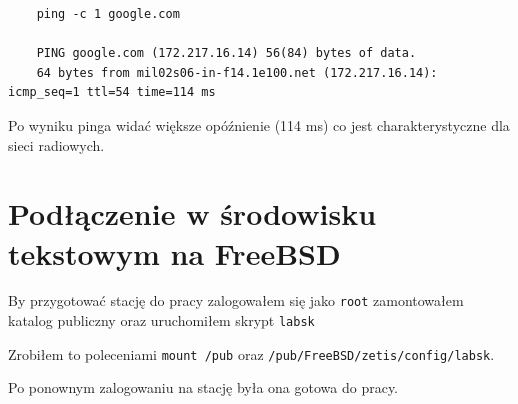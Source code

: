 \documentclass{mwart} %
\begin{document}
\begin{verbatim}
    ping -c 1 google.com

    PING google.com (172.217.16.14) 56(84) bytes of data. 
    64 bytes from mil02s06-in-f14.1e100.net (172.217.16.14): icmp_seq=1 ttl=54 time=114 ms 
\end{verbatim}
Po wyniku pinga widać większe opóźnienie (114 ms) co jest charakterystyczne dla sieci radiowych.

\section{Podłączenie w środowisku tekstowym na FreeBSD}
By przygotować stację do pracy zalogowałem się jako \texttt{root} zamontowałem katalog publiczny oraz uruchomiłem skrypt \texttt{labsk}




Zrobiłem to poleceniami \texttt{mount /pub} oraz \texttt{/pub/FreeBSD/zetis/config/labsk}.

Po ponownym zalogowaniu na stację była ona gotowa do pracy.
\end{document}
